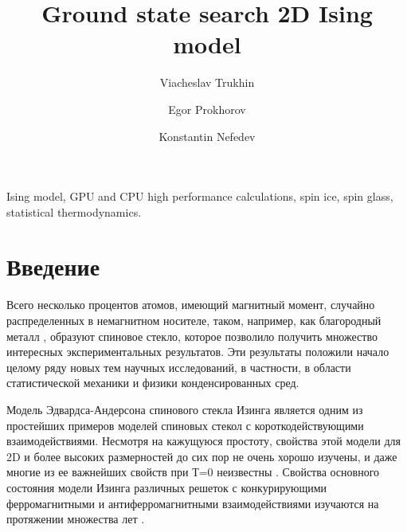 \documentclass[utf8, babel, sor, jor, amsmath,amssymb, reprint]{elsarticle} %
\begin{document}
\begin{frontmatter}


\title{Ground state search 2D Ising model}

\author[mainaddress, secondaryaddress]{Viacheslav Trukhin}

\author[mainaddress]{Egor Prokhorov}

\author[mainaddress, secondaryaddress]{Konstantin Nefedev}


\address[mainaddress]{Far Eastern Federal University, Vladivostok, Russky Island, 10 Ajax Bay, 690922, the Russian Federation}
\address[secondaryaddress]{Institute of Applied Mathematics, Far Eastern Branch, Russian Academy of Science, Vladivostok, Radio 7, 690041, the Russian Federation}

\begin{abstract}


\end{abstract}


\begin{keyword}
Ising model, GPU and CPU high performance calculations, spin ice, spin glass, statistical thermodynamics.

\end{keyword}


\end{frontmatter}

\linenumbers
\newpage
\tableofcontents

\newpage
\section{Введение}

Всего несколько процентов атомов, имеющий магнитный момент, случайно распределенных в немагнитном носителе, таком, например, как благородный металл  \cite{finkler1989spin}, образуют спиновое стекло, которое позволило получить множество интересных экспериментальных результатов. Эти результаты положили начало целому ряду новых тем научных исследований, в частности, в области статистической механики и физики конденсированных сред.

Модель Эдвардса-Андерсона спинового стекла Изинга является одним из простейших примеров моделей спиновых стекол с короткодействующими взаимодействиями. Несмотря на кажущуюся простоту, свойства этой модели для 2D и более высоких размерностей до сих пор не очень хорошо изучены, и даже многие из ее важнейших свойств при Т=0 неизвестны \cite{pal1996ground}. Свойства основного состояния модели Изинга различных решеток с конкурирующими ферромагнитными и антиферромагнитными взаимодействиями изучаются на протяжении множества лет \cite{lebrecht2004plaquette, valdes2012j, lebrecht2015j}.
\end{document}
